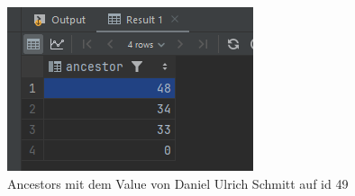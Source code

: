 \documentclass[11pt]{scrartcl}
\begin{document}
\begin{figure}[H]
    \begin{minipage}[b]{.4\linewidth}
        \begin{center}
            \includegraphics[width=\linewidth]{img_2.png}
            \caption{Ancestors mit dem Value von Daniel Ulrich Schmitt auf id 49}
        \end{center}
    \end{minipage}
    \hspace{.1\linewidth}
    \begin{minipage}[b]{.4\linewidth}
        \begin{center}

\end{center}
\end{minipage}
\end{figure}
\end{document}
